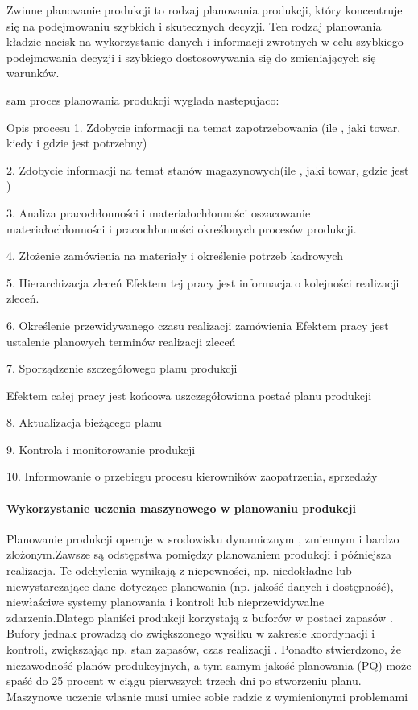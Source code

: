 Zwinne planowanie produkcji to rodzaj planowania produkcji, który koncentruje się na podejmowaniu szybkich i skutecznych decyzji. Ten rodzaj planowania kładzie nacisk na wykorzystanie danych i informacji zwrotnych w celu szybkiego podejmowania decyzji i szybkiego dostosowywania się do zmieniających się warunków.



sam proces planowania produkcji wyglada nastepujaco:

Opis procesu
1. Zdobycie informacji na temat zapotrzebowania (ile , jaki towar, kiedy i gdzie jest potrzebny)

2. Zdobycie informacji na temat stanów magazynowych(ile , jaki towar,  gdzie jest )


3. Analiza pracochłonności i materiałochłonności
oszacowanie materiałochłonności i pracochłonności określonych procesów produkcji. 

4. Złożenie zamówienia na materiały i określenie potrzeb kadrowych

5. Hierarchizacja zleceń
Efektem tej pracy jest informacja o kolejności realizacji zleceń.

6. Określenie przewidywanego czasu realizacji zamówienia
 Efektem pracy jest ustalenie planowych terminów realizacji zleceń

 
7. Sporządzenie szczegółowego planu produkcji

 Efektem całej pracy jest końcowa uszczegółowiona postać planu produkcji
 
8. Aktualizacja bieżącego planu

9. Kontrola i monitorowanie produkcji

10. Informowanie o przebiegu procesu kierowników zaopatrzenia, sprzedaży

 
\cite{encp2023}\cite{pl2023}\cite{pla2023}\cite{des2023}\cite{wikm2023}\cite{wikmr2023}\cite{wikc2023}\cite{Hanne2017}


\newpage
\paragraph{Wykorzystanie uczenia maszynowego w planowaniu produkcji}
 \vspace{\baselineskip} 

 Planowanie produkcji operuje w srodowisku dynamicznym , zmiennym i bardzo zlożonym.Zawsze są odstępstwa pomiędzy planowaniem produkcji i późniejsza realizacja. Te odchylenia wynikają z niepewności, np. niedokładne lub niewystarczające dane dotyczące planowania (np. jakość danych i
dostępność), niewłaściwe systemy planowania i kontroli lub nieprzewidywalne zdarzenia.Dlatego planiści produkcji korzystają z buforów w postaci zapasów . Bufory jednak prowadzą do
zwiększonego wysiłku w zakresie koordynacji i kontroli, zwiększając np.  stan zapasów, czas realizacji . Ponadto stwierdzono, że niezawodność planów produkcyjnych, a tym samym jakość planowania (PQ) może spaść do 25 procent w ciągu pierwszych trzech dni po stworzeniu planu. Maszynowe uczenie wlasnie musi umiec sobie radzic z wymienionymi problemami\cite{ryb2019}

